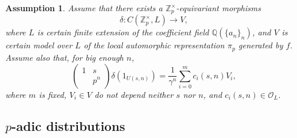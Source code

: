 \documentclass{amsart}
\newtheorem{assumption0}[defn0]{Assumption}
\newenvironment{assumption}{\begin{assumption0}\rm}{\end{assumption0}}
\newcommand{\Z}{{\mathbb Z}}
\newcommand{\Q}{{\mathbb Q}}
\newcommand{\cO}{{\mathcal O}}
\begin{document}
\begin{assumption}\label{mainassumption}
Assume that there exists a $\Z_p^\times$-equivariant morphisms 
\[
\delta:C(\Z_p^\times,L)\longrightarrow V,
\]
where $L$ is certain finite extension of the coefficient field $\Q(\{a_n\}_n)$,  and $V$ is certain model over $L$ of the local automorphic representation $\pi_p$ generated by $f$. Assume also that, for big enough $n$,
\begin{equation}\label{keyprop}
\left(\begin{array}{cc}1&s\\&p^n\end{array}\right)\delta(1_{U(s,n)})=\frac{1}{\gamma^n}\sum_{i=0}^mc_i(s,n)V_i,
\end{equation}
where $m$ is fixed, $V_i\in V$ do not depend neither $s$ nor $n$, and $c_i(s,n)\in \cO_L$.
\end{assumption}


\subsection{$p$-adic distributions}
\end{document}
